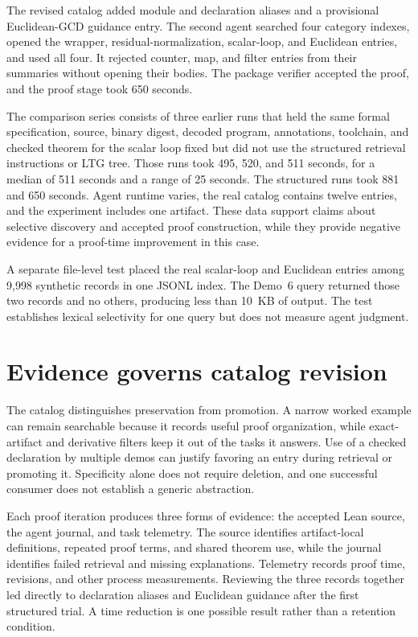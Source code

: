 \documentclass[10pt]{article}
\begin{document}
The revised catalog added module and declaration aliases and a provisional Euclidean-GCD guidance entry.  The second agent searched four category indexes, opened the wrapper, residual-normalization, scalar-loop, and Euclidean entries, and used all four.  It rejected counter, map, and filter entries from their summaries without opening their bodies.  The package verifier accepted the proof, and the proof stage took 650 seconds.

The comparison series consists of three earlier runs that held the same formal specification, source, binary digest, decoded program, annotations, toolchain, and checked theorem for the scalar loop fixed but did not use the structured retrieval instructions or LTG tree.  Those runs took 495, 520, and 511 seconds, for a median of 511 seconds and a range of 25 seconds.  The structured runs took 881 and 650 seconds.  Agent runtime varies, the real catalog contains twelve entries, and the experiment includes one artifact.  These data support claims about selective discovery and accepted proof construction, while they provide negative evidence for a proof-time improvement in this case.

A separate file-level test placed the real scalar-loop and Euclidean entries among 9,998 synthetic records in one JSONL index.  The Demo~6 query returned those two records and no others, producing less than 10~KB of output.  The test establishes lexical selectivity for one query but does not measure agent judgment.

\section{Evidence governs catalog revision}

The catalog distinguishes preservation from promotion.  A narrow worked example can remain searchable because it records useful proof organization, while exact-artifact and derivative filters keep it out of the tasks it answers.  Use of a checked declaration by multiple demos can justify favoring an entry during retrieval or promoting it.  Specificity alone does not require deletion, and one successful consumer does not establish a generic abstraction.

Each proof iteration produces three forms of evidence: the accepted Lean source, the agent journal, and task telemetry.  The source identifies artifact-local definitions, repeated proof terms, and shared theorem use, while the journal identifies failed retrieval and missing explanations.  Telemetry records proof time, revisions, and other process measurements.  Reviewing the three records together led directly to declaration aliases and Euclidean guidance after the first structured trial.  A time reduction is one possible result rather than a retention condition.
\end{document}
